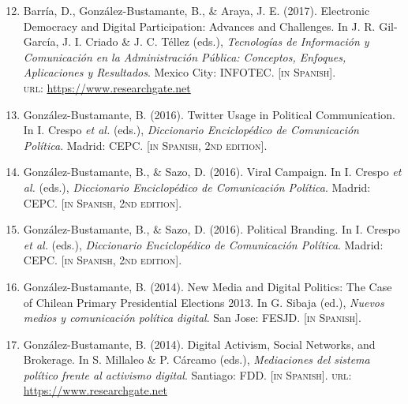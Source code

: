 \documentclass[letterpaper,margin]{res}
\newenvironment{benumerate}[1]{
    \let\oldItem\item
    \def\item{\addtocounter{enumi}{-2}\oldItem}
    \begin{enumerate}
    \setcounter{enumi}{#1}
    \addtocounter{enumi}{1}
}{
    \end{enumerate}
}
\begin{document}
\begin{resume}
\begin{benumerate}{11}
\item{\small Barr\'ia, D., Gonz\'alez-Bustamante, B., \& Araya, J. E. (2017). Electronic Democracy and Digital Participation: Advances and Challenges. In J. R. Gil-Garc\'ia, J. I. Criado \&  J. C. T\'ellez (eds.), {\itshape Tecnolog\'ias de Informaci\'on y Comunicaci\'on en la Administraci\'on P\'ublica: Conceptos, Enfoques, Aplicaciones y Resultados}. Mexico City: INFOTEC. {\footnotesize \scshape [in Spanish]}. \\ {\scshape url}: \href{https://www.researchgate.net/publication/321980289_Democracia_electronica_y_participacion_digital_Avances_y_desafios}{https://www.researchgate.net}}\vspace{1mm}

\item{\small Gonz\'alez-Bustamante, B. (2016). Twitter Usage in Political Communication. In I. Crespo {\itshape et al.} (eds.), {\itshape Diccionario Enciclop\'edico de Comunicaci\'on Pol\'itica}. Madrid: CEPC. {\footnotesize \scshape [in Spanish, 2nd edition]}.}\vspace{1mm}

\item{\small Gonz\'alez-Bustamante, B., \& Sazo, D. (2016). Viral Campaign. In I. Crespo {\itshape et al.} (eds.), {\itshape Diccionario Enciclop\'edico de Comunicaci\'on Pol\'itica}. Madrid: CEPC. {\footnotesize \scshape [in Spanish, 2nd edition]}.}\vspace{1mm}

\item{\small Gonz\'alez-Bustamante, B., \& Sazo, D. (2016). Political Branding. In I. Crespo {\itshape et al.} (eds.), {\itshape Diccionario Enciclop\'edico de Comunicaci\'on Pol\'itica}. Madrid: CEPC. {\footnotesize \scshape [in Spanish, 2nd edition]}.}\vspace{1mm}

\item{\small Gonz\'alez-Bustamante, B. (2014). New Media and Digital Politics: The Case of Chilean Primary Presidential Elections 2013. In G. Sibaja (ed.), {\itshape Nuevos medios y comunicaci\'on pol\'itica digital}. San Jose: FESJD. {\footnotesize \scshape [in Spanish]}.}\vspace{1mm}

\item{\small Gonz\'alez-Bustamante, B. (2014). Digital Activism, Social Networks, and Brokerage. In S. Millaleo \& P. C\'arcamo (eds.), {\itshape Mediaciones del sistema pol\'itico frente al activismo digital}. Santiago: FDD. {\footnotesize \scshape [in Spanish]}. {\scshape url}: \href{https://www.researchgate.net/publication/321992867_Activismo_digital_redes_sociales_e_intermediacion}{https://www.researchgate.net}}\vspace{1mm}


\end{benumerate}
\end{resume}
\end{document}
